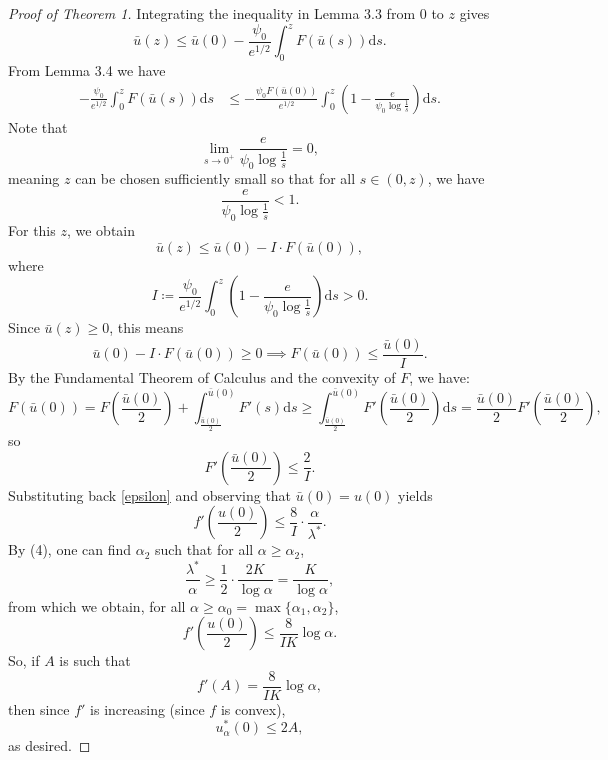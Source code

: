 \documentclass{article}
\begin{document}
    \begin{proof}[Proof of Theorem 1]
    Integrating the inequality in Lemma 3.3 from 0 to $z$ gives
    \[\bar u(z)\leq \bar u(0) - \frac{\psi_0}{e^{1/2}}\int_0^{z} F(\bar u(s))\mathrm{d}s.\]
    From Lemma 3.4 we have
    \begin{align*}
        -\frac{\psi_0}{e^{1/2}}\int_0^{z} F(\bar u(s))\mathrm{d}s &\leq -\frac{\psi_0F(\bar u(0))}{e^{1/2}}\int_0^{z}\left(1 - \frac e{\psi_0\log\frac 1s}\right)\mathrm{d}s.
    \end{align*}
    Note that
    \[\lim_{s\to 0^+}\frac{e}{\psi_0\log\frac 1s} = 0,\]
    meaning $z$ can be chosen sufficiently small so that for all $s\in(0,z)$, we have
    \[\frac{e}{\psi_0\log\frac 1s} < 1.\]
    For this $z$, we obtain
    \[\bar u(z) \leq \bar u(0) - I\cdot F(\bar u(0)),\]
    where
    \[I \coloneqq \frac{\psi_0}{e^{1/2}}\int_0^{z}\left(1-\frac e{\psi_0\log\frac 1s}\right)\mathrm{d}s > 0.\]
    Since $\bar u(z)\geq 0$, this means
    \[\bar u(0) - I\cdot F(\bar u(0))\geq 0\implies F(\bar u(0)) \leq \frac{\bar u(0)}I.\]
    By the Fundamental Theorem of Calculus and the convexity of $F$, we have:
    \[F(\bar u(0)) = F\left(\frac{\bar u(0)}2\right) + \int_{\frac{\bar u(0)}2}^{\bar u(0)}F'(s)\mathrm{d}s\geq \int_{\frac{\bar u(0)}2}^{\bar u(0)}F'\left(\frac{\bar u(0)}2\right)\mathrm{d}s = \frac{\bar u(0)}2F'\left(\frac{\bar u(0)}2\right),\]
    so
    \[F'\left(\frac{\bar u(0)}2\right) \leq \frac 2I.\]
    Substituting back \eqref{epsilon} and observing that $\bar u(0) = u(0)$ yields
    \[f'\left(\frac{u(0)}2\right)\leq \frac 8I\cdot \frac \alpha{\lambda^*}.\]
    By (4), one can find $\alpha_2$ such that for all $\alpha\geq\alpha_2$,
    \[\frac{\lambda^*}{\alpha}\geq \frac 12\cdot \frac{2K}{\log\alpha} = \frac K{\log\alpha},\]
    from which we obtain, for all $\alpha\geq\alpha_0= \max\{\alpha_1, \alpha_2\}$,
    \[f'\left(\frac{u(0)}2\right)\leq\frac8{IK}\log\alpha.\]
    So, if $A$ is such that
    \[f'(A)=\frac8{IK}\log\alpha,\]
    then since $f'$ is increasing (since $f$ is convex),
    \[u_\alpha^*(0)\leq2A,\]
    as desired.
    \end{proof}
\end{document}
